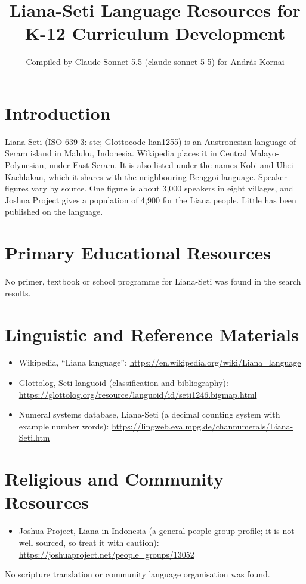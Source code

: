 \documentclass[12pt]{article}
\title{Liana-Seti Language Resources for K-12 Curriculum Development}
\author{Compiled by Claude Sonnet 5.5 (claude-sonnet-5-5) for Andr\'as Kornai}
\date{}
\begin{document}
\maketitle

\section{Introduction}
Liana-Seti (ISO 639-3: ste; Glottocode lian1255) is an Austronesian language of Seram island in Maluku, Indonesia. Wikipedia places it in Central Malayo-Polynesian, under East Seram. It is also listed under the names Kobi and Uhei Kachlakan, which it shares with the neighbouring Benggoi language. Speaker figures vary by source. One figure is about 3,000 speakers in eight villages, and Joshua Project gives a population of 4,900 for the Liana people. Little has been published on the language.

\section{Primary Educational Resources}
No primer, textbook or school programme for Liana-Seti was found in the search results.

\section{Linguistic and Reference Materials}
\begin{itemize}
\item Wikipedia, ``Liana language'': \url{https://en.wikipedia.org/wiki/Liana_language}
\item Glottolog, Seti languoid (classification and bibliography): \url{https://glottolog.org/resource/languoid/id/seti1246.bigmap.html}
\item Numeral systems database, Liana-Seti (a decimal counting system with example number words): \url{https://lingweb.eva.mpg.de/channumerals/Liana-Seti.htm}
\end{itemize}

\section{Religious and Community Resources}
\begin{itemize}
\item Joshua Project, Liana in Indonesia (a general people-group profile; it is not well sourced, so treat it with caution): \url{https://joshuaproject.net/people_groups/13052}
\end{itemize}
No scripture translation or community language organisation was found.
\end{document}
